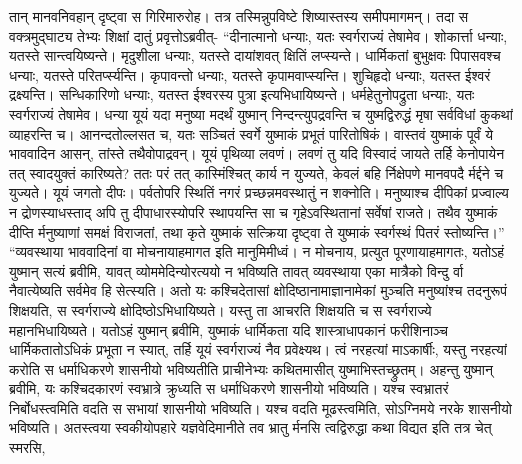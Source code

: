 \adhyAya
{}
\vakya तान् मानवनिवहान् दृष्ट्वा स गिरिमारुरोह। तत्र तस्मिन्नुपविष्टे शिष्यास्तस्य समीपमागमन्।
\vakya तदा स वक्त्रमुद्घाट्य तेभ्यः शिक्षां दातुं प्रवृत्तोऽब्रवीत्-
\vakya “दीनात्मानो धन्याः, यतः स्वर्गराज्यं तेषामेव।
\vakya शोकार्त्ता धन्याः, यतस्ते सान्त्वयिष्यन्ते।
\vakya मृदुशीला धन्याः, यतस्ते दायांशवत् क्षितिं लप्स्यन्ते।
\vakya धार्मिकतां बुभुक्षवः पिपासवश्च धन्याः, यतस्ते परितर्प्स्यन्ति।
\vakya कृपावन्तो धन्याः, यतस्ते कृपामवाप्स्यन्ति।
\vakya शुचिहृदो धन्याः, यतस्त ईश्वरं द्रक्ष्यन्ति।
\vakya सन्धिकारिणो धन्याः, यतस्त ईश्वरस्य पुत्रा इत्यभिधायिष्यन्ते।
\vakya धर्महेतुनोपद्रुता धन्याः, यतः स्वर्गराज्यं तेषामेव।
\vakya धन्या यूयं यदा मनुष्या मदर्थं युष्मान् निन्दन्त्युपद्रवन्ति च युष्मद्विरुद्धं मृषा सर्वविधां कुकथां व्याहरन्ति च।
\vakya आनन्दतोल्लसत च, यतः सञ्चितं स्वर्गे युष्माकं प्रभूतं पारितोषिकं। वास्तवं युष्माकं पूर्वं ये भाववादिन आसन्, तांस्ते तथैवोपाद्रवन्।
\vakya यूयं पृथिव्या लवणं। लवणं तु यदि विस्वादं जायते तर्हि केनोपायेन तत् स्वादयुक्तं कारिष्यते? ततः परं तत् कास्मिंश्चित् कार्य न युज्यते, केवलं बहि र्निक्षेपणे मानवपदै र्मर्द्दने च युज्यते।
\vakya यूयं जगतो दीपः। पर्वतोपरि स्थितिं नगरं प्रच्छन्नमवस्थातुं न शक्नोति।
\vakya मनुष्याश्च दीपिकां प्रज्वाल्य न द्रोणस्याधस्ताद् अपि तु दीपाधारस्योपरि स्थापयन्ति सा च गृहेऽवस्थितानां सर्वेषां राजते।
\vakya तथैव युष्माकं दीप्ति र्मनुष्याणां समक्षं विराजतां, तथा कृते युष्माकं सत्क्रिया दृष्ट्वा ते युष्माकं स्वर्गस्थं पितरं स्तोष्यन्ति।”
\vakya “व्यवस्थाया भाववादिनां वा मोचनायाहमागत इति मानुमिमीध्वं।
\vakya न मोचनाय, प्रत्युत पूरणायाहमागतः, यतोऽहं युष्मान् सत्यं ब्रवीमि, यावत् व्योममेदिन्योरत्ययो न भविष्यति तावत् व्यवस्थाया एका मात्रैको विन्दु र्वा नैवात्येष्यति सर्वमेव हि सेत्स्यति।
\vakya अतो यः कश्चिदेतासां क्षोदिष्ठानामाज्ञानामेकां मुञ्चति मनुष्यांश्च तदनुरूपं शिक्षयति, स स्वर्गराज्ये क्षोदिष्ठोऽभिधायिष्यते।
\vakya यस्तु ता आचरति शिक्षयति च स स्वर्गराज्ये महानभिधायिष्यते। यतोऽहं युष्मान् ब्रवीमि, युष्माकं धार्मिकता यदि शास्त्राधापकानं फरीशिनाञ्च धार्मिकतातोऽधिकं प्रभूता न स्यात्, तर्हि यूयं स्वर्गराज्यं नैव प्रवेक्ष्यथ।
\vakya त्वं नरहत्यां माऽकार्षीः, यस्तु नरहत्यां करोति स धर्माधिकरणे शासनीयो भविष्यतीति प्राचीनेभ्यः कथितमासीत् युष्माभिस्तच्छ्रुतम्।
\vakya अहन्तु युष्मान् ब्रवीमि, यः कश्चिदकारणं स्वभ्रात्रे क्रुध्यति स धर्माधिकरणे शासनीयो भविष्यति। यश्च स्वभ्रातरं निर्बोधस्त्वमिति वदति स सभायां शासनीयो भविष्यति। यश्च वदति मूढस्त्वमिति, सोऽग्निमये नरके शासनीयो भविष्यति।
\vakya अतस्त्वया स्वकीयोपहारे यज्ञवेदिमानीते तव भ्रातु र्मनसि त्वद्विरुद्धा कथा विद्यत इति तत्र चेत् स्मरसि,
